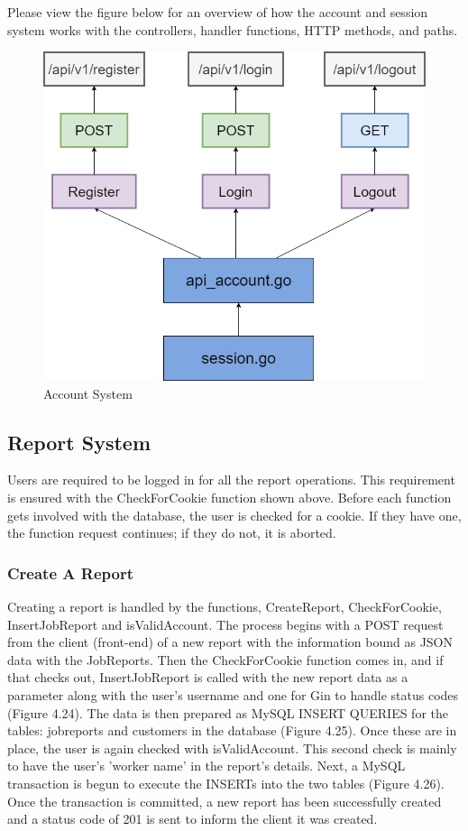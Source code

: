 Please view the figure below for an overview of how the account and session system works with the controllers, handler functions, HTTP methods, and paths.
\begin{figure}[H]
    \caption{Account System}
    \label{image:accountSystem}
    \centering
    \includegraphics[width=1.0\textwidth]{images/horton/account_system/account_system.png}
\end{figure}

\subsection{Report System}
Users are required to be logged in for all the report operations. This requirement is ensured with the CheckForCookie function shown above. Before each function gets involved with the database, the user is checked for a cookie. If they have one, the function request continues; if they do not, it is aborted.

\subsubsection{Create A Report}
Creating a report is handled by the functions, CreateReport, CheckForCookie, InsertJobReport
and isValidAccount. The process begins with a POST request from the client (front-end) of a new report with the information bound as JSON data with the JobReports. Then the CheckForCookie function comes in, and if that checks out, InsertJobReport is called with the new report data as a parameter along with the user's username and one for Gin to handle status codes (Figure 4.24). The data is then prepared as MySQL INSERT QUERIES for the tables: jobreports and customers in the database (Figure 4.25). Once these are in place, the user is again checked with isValidAccount. This second check is mainly to have the user's 'worker name' in the report's details. Next, a MySQL transaction is begun to execute the INSERTs into the two tables (Figure 4.26). Once the transaction is committed, a new report has been successfully created and a status code of 201 is sent to inform the client it was created. 

